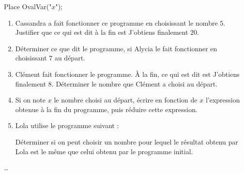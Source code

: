 \begin{exercice*}
\begin{minipage}{0.35\linewidth}
{{        \smallskip
        \begin{Scratch}[Echelle=0.7]
            Place OvalVar("$x$");
        \end{Scratch}
        }
        }
    \end{minipage}
    \begin{enumerate}
        \item Cassandra a fait fonctionner ce programme en choisissant le nombre $5$. Justifier que ce qui est dit à la fin est \og J'obtiens finalement $20$\fg{}.
        \item Déterminer ce que dit le programme, si Alycia le fait fonctionner en choisissant $7$ au départ.
        \item Clément fait fonctionner le programme. À la fin, ce qui est dit est \og J'obtiens finalement $8$\fg{}. Déterminer le nombre que Clément a choisi au départ.
        \item Si on note $x$ le nombre choisi au départ, écrire en fonction de $x$ l'expression obtenue à la fin du programme, puis réduire cette expression.
        \item Lola utilise le programme suivant :
        
        \begin{minipage}{0.5\linewidth}
        \end{minipage}

        \smallskip
        Déterminer si on peut choisir un nombre pour lequel le résultat obtenu par Lola est le même que celui obtenu par le programme initial.
    \end{enumerate}
\end{exercice*}
\begin{corrige}
    \dots
\end{corrige}

